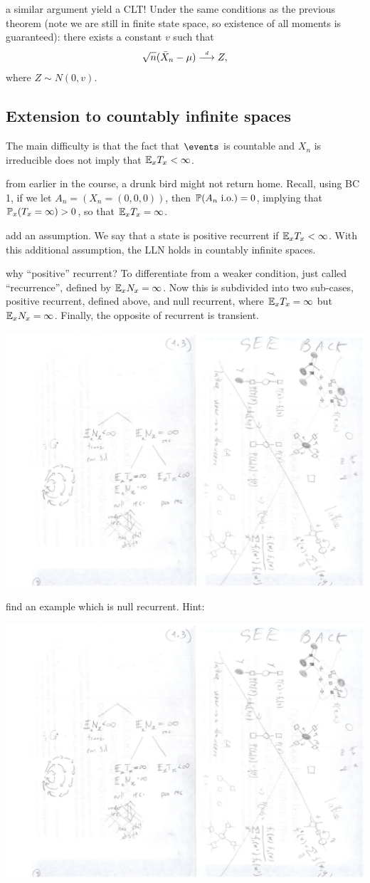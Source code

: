 \documentclass{article}
\begin{document}
 a similar argument yield a CLT! Under the same conditions as the previous theorem (note we are still in finite state space, so existence of all moments is guaranteed): there exists a constant $v$ such that
\[ \sqrt{n}(\bar X_n - \mu) \dcv Z, \]
where $Z \sim N(0, v)$.


\subsection{Extension to countably infinite spaces}

The main difficulty is that the fact that $\events$ is countable and $X_n$ is irreducible does not imply that $\E_x T_x < \infty$.

 from earlier in the course, a drunk bird might not return home. Recall, using BC 1, if we let $A_n = (X_n = (0,0,0))$, then $\P(A_n \io) = 0$, implying that $\P_x(T_x = \infty) > 0$, so that $\E_x T_x = \infty$. 

 add an assumption. We say that a state is positive recurrent if $\E_x T_x < \infty$. With this additional assumption, the LLN holds in countably infinite spaces.

 why ``positive'' recurrent? To differentiate from a weaker condition, just called ``recurrence'', defined by $\E_x N_x = \infty$. Now this is subdivided into two sub-cases, positive recurrent, defined above, and null recurrent, where $\E_x T_x = \infty$ but $\E_x N_x = \infty$. Finally, the opposite of recurrent is transient.
\begin{center}
	\includegraphics[width=0.5\linewidth]{figures/rec-hierarchy} 
\end{center}

 find an example which is null recurrent. Hint:
\begin{center}
	\includegraphics[width=0.2\linewidth]{figures/null-rec} 
\end{center}
\end{document}
